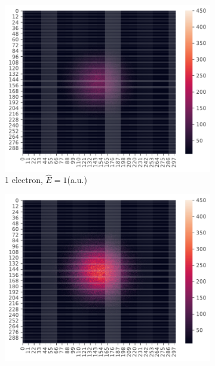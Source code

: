 \documentclass[11pt,a4paper,titlepage]{article}
\begin{document}
\begin{figure}[H]
\begin{subfigure}[t]{.5\textwidth}
\centering
\includegraphics[trim=0cm 0.0cm 0cm 0cm,scale = 0.6]{D2_P_1I_N_Importance_S_2pow20_eqS_2pow20_Position_SamplingSingle_E1.pdf}
\caption{1 electron, $\hat E = 1$(a.u.)}
\label{imp1}
\end{subfigure}
\begin{subfigure}[t]{.5\textwidth}
\centering
\includegraphics[trim=0cm 0.0cm 0cm 0.0cm,scale = 0.6]{D2_P_2I_N_Importance_S_2pow20_eqS_2pow20_Position_SamplingNON_interactingE1_9997.pdf}

\end{subfigure}
\end{figure}
\end{document}
